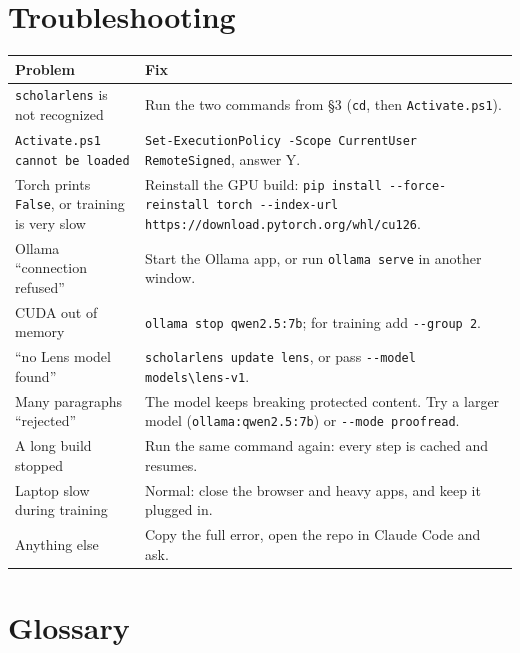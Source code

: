 \documentclass[11pt]{article}
\newcommand{\cm}[1]{\texttt{#1}}
\begin{document}
\section{Troubleshooting}
\label{sec:trouble}

\begin{tabularx}{\linewidth}{@{}>{\raggedright\arraybackslash}p{5.2cm} >{\raggedright\arraybackslash}X@{}}
\toprule
Problem & Fix \\
\midrule
\cm{scholarlens} is not recognized & Run the two commands from \S3 (\cm{cd}, then \cm{Activate.ps1}). \\
\cm{Activate.ps1 cannot be loaded} & \cm{Set-ExecutionPolicy -Scope CurrentUser RemoteSigned}, answer Y. \\
Torch prints \cm{False}, or training is very slow & Reinstall the GPU build: \cm{pip install -{}-force-reinstall torch -{}-index-url https://download.pytorch.org/whl/cu126}. \\
Ollama ``connection refused'' & Start the Ollama app, or run \cm{ollama serve} in another window. \\
CUDA out of memory & \cm{ollama stop qwen2.5:7b}; for training add \cm{-{}-group 2}. \\
``no Lens model found'' & \cm{scholarlens update lens}, or pass \cm{-{}-model models\textbackslash lens-v1}. \\
Many paragraphs ``rejected'' & The model keeps breaking protected content. Try a larger model (\cm{ollama:qwen2.5:7b}) or \cm{-{}-mode proofread}. \\
A long build stopped & Run the same command again: every step is cached and resumes. \\
Laptop slow during training & Normal: close the browser and heavy apps, and keep it plugged in. \\
Anything else & Copy the full error, open the repo in Claude Code and ask. \\
\bottomrule
\end{tabularx}

\section{Glossary}
\end{document}
